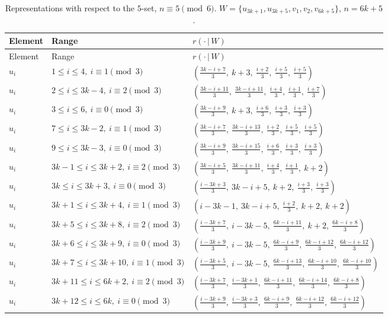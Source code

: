 \begin{longtable}{lll}
\caption{Representations with respect to the $5$-set, $n\equiv 5 \pmod 6$. $W=\{u_{3k+1}, u_{3k+5}, v_{1}, v_{2}, v_{6k+5}\}$, $n=6k+5$.}\label{tab:W55}\\
\hline Element & Range & $r(\cdot\,|\,W)$ \\ \hline
\endfirsthead
\hline Element & Range & $r(\cdot\,|\,W)$ \\ \hline
\endhead
$u_i$ & $1 \le i \le 4,\ i \equiv 1 \pmod{3}$ & $(\frac{3k-i+7}{3},\ k+3,\ \frac{i+2}{3},\ \frac{i+5}{3},\ \frac{i+5}{3})$ \\
$u_i$ & $2 \le i \le 3k-4,\ i \equiv 2 \pmod{3}$ & $(\frac{3k-i+11}{3},\ \frac{3k-i+11}{3},\ \frac{i+4}{3},\ \frac{i+1}{3},\ \frac{i+7}{3})$ \\
$u_i$ & $3 \le i \le 6,\ i \equiv 0 \pmod{3}$ & $(\frac{3k-i+9}{3},\ k+3,\ \frac{i+6}{3},\ \frac{i+3}{3},\ \frac{i+3}{3})$ \\
$u_i$ & $7 \le i \le 3k-2,\ i \equiv 1 \pmod{3}$ & $(\frac{3k-i+7}{3},\ \frac{3k-i+13}{3},\ \frac{i+2}{3},\ \frac{i+5}{3},\ \frac{i+5}{3})$ \\
$u_i$ & $9 \le i \le 3k-3,\ i \equiv 0 \pmod{3}$ & $(\frac{3k-i+9}{3},\ \frac{3k-i+15}{3},\ \frac{i+6}{3},\ \frac{i+3}{3},\ \frac{i+3}{3})$ \\
$u_i$ & $3k-1 \le i \le 3k+2,\ i \equiv 2 \pmod{3}$ & $(\frac{3k-i+5}{3},\ \frac{3k-i+11}{3},\ \frac{i+4}{3},\ \frac{i+1}{3},\ k+2)$ \\
$u_i$ & $3k \le i \le 3k+3,\ i \equiv 0 \pmod{3}$ & $(\frac{i-3k+3}{3},\ 3k-i+5,\ k+2,\ \frac{i+3}{3},\ \frac{i+3}{3})$ \\
$u_i$ & $3k+1 \le i \le 3k+4,\ i \equiv 1 \pmod{3}$ & $(i-3k-1,\ 3k-i+5,\ \frac{i+2}{3},\ k+2,\ k+2)$ \\
$u_i$ & $3k+5 \le i \le 3k+8,\ i \equiv 2 \pmod{3}$ & $(\frac{i-3k+7}{3},\ i-3k-5,\ \frac{6k-i+11}{3},\ k+2,\ \frac{6k-i+8}{3})$ \\
$u_i$ & $3k+6 \le i \le 3k+9,\ i \equiv 0 \pmod{3}$ & $(\frac{i-3k+9}{3},\ i-3k-5,\ \frac{6k-i+9}{3},\ \frac{6k-i+12}{3},\ \frac{6k-i+12}{3})$ \\
$u_i$ & $3k+7 \le i \le 3k+10,\ i \equiv 1 \pmod{3}$ & $(\frac{i-3k+5}{3},\ i-3k-5,\ \frac{6k-i+13}{3},\ \frac{6k-i+10}{3},\ \frac{6k-i+10}{3})$ \\
$u_i$ & $3k+11 \le i \le 6k+2,\ i \equiv 2 \pmod{3}$ & $(\frac{i-3k+7}{3},\ \frac{i-3k+1}{3},\ \frac{6k-i+11}{3},\ \frac{6k-i+14}{3},\ \frac{6k-i+8}{3})$ \\
$u_i$ & $3k+12 \le i \le 6k,\ i \equiv 0 \pmod{3}$ & $(\frac{i-3k+9}{3},\ \frac{i-3k+3}{3},\ \frac{6k-i+9}{3},\ \frac{6k-i+12}{3},\ \frac{6k-i+12}{3})$ \\

\end{longtable}

